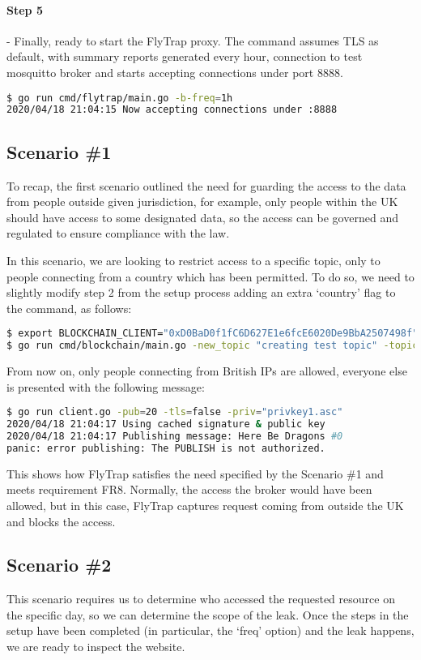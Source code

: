\paragraph{Step 5} - Finally, ready to start the FlyTrap proxy. The command assumes TLS as default, with summary reports generated every hour, connection to test mosquitto broker and starts accepting connections under port 8888.
\begin{lstlisting}[language=bash,breaklines=true]
$ go run cmd/flytrap/main.go -b-freq=1h
2020/04/18 21:04:15 Now accepting connections under :8888
\end{lstlisting}
\subsection{Scenario \#1}
To recap, the first scenario outlined the need for guarding the access to the data from people outside given jurisdiction, for example, only people within the UK should have access to some designated data, so the access can be governed and regulated to ensure compliance with the law.

In this scenario, we are looking to restrict access to a specific topic, only to people connecting from a country which has been permitted. To do so, we need to slightly modify step 2 from the setup process adding an extra `country' flag to the command, as follows:
\begin{lstlisting}[language=bash,breaklines=true]
$ export BLOCKCHAIN_CLIENT="0xD0BaD0f1fC6D627E1e6fcE6020De9BbA2507498f"
$ go run cmd/blockchain/main.go -new_topic "creating test topic" -topic "RestrictedTopic" -country="GB"
\end{lstlisting}
From now on, only people connecting from British IPs are allowed, everyone else is presented with the following message:
\begin{lstlisting}[language=bash,breaklines=true]
$ go run client.go -pub=20 -tls=false -priv="privkey1.asc"
2020/04/18 21:04:17 Using cached signature & public key
2020/04/18 21:04:17 Publishing message: Here Be Dragons #0
panic: error publishing: The PUBLISH is not authorized.
\end{lstlisting}
This shows how FlyTrap satisfies the need specified by the Scenario \#1 and meets requirement FR8. Normally, the access the broker would have been allowed, but in this case, FlyTrap captures request coming from outside the UK and blocks the access.
\subsection{Scenario \#2}
This scenario requires us to determine who accessed the requested resource on the specific day, so we can determine the scope of the leak. Once the steps in the setup have been completed (in particular, the `freq' option) and the leak happens, we are ready to inspect the website.

